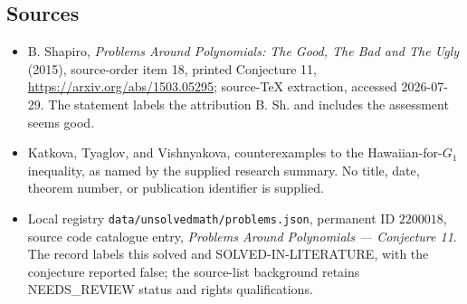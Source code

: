 \documentclass[11pt]{article}
\begin{document}
\subsection{Sources}
\begin{itemize}
\item B. Shapiro, \emph{Problems Around Polynomials: The Good, The Bad and The Ugly} (2015), source-order item 18, printed Conjecture 11, \url{https://arxiv.org/abs/1503.05295}; source-TeX extraction, accessed 2026-07-29. The statement labels the attribution B. Sh. and includes the assessment seems good.
\item Katkova, Tyaglov, and Vishnyakova, counterexamples to the Hawaiian-for-$G_1$ inequality, as named by the supplied research summary. No title, date, theorem number, or publication identifier is supplied.
\item Local registry \texttt{data/unsolvedmath/problems.json}, permanent ID $2200018$, source code catalogue entry, \emph{Problems Around Polynomials --- Conjecture 11}. The record labels this solved and SOLVED-IN-LITERATURE, with the conjecture reported false; the source-list background retains NEEDS\_REVIEW status and rights qualifications.
\end{itemize}
\end{document}
